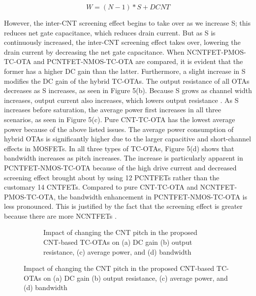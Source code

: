 \begin{equation}
  W = (N - 1)*S + DCNT
  \label{eq:10}
\end{equation}

However, the inter-CNT screening effect begins to take over as we increase S;
this reduces net gate capacitance, which reduces drain current. But as S is
continuously increased, the inter-CNT screening effect takes over, lowering the
drain current by decreasing the net gate capacitance. When NCNTFET-PMOS-TC-OTA
and PCNTFET-NMOS-TC-OTA are compared, it is evident that the former has a higher
DC gain than the latter. Furthermore, a slight increase in S modifies the DC
gain of the hybrid TC-OTAs. The output resistance of all OTAs decreases as S
increases, as seen in Figure 5(b). Because S grows as channel width increases,
output current also increases, which lowers output resistance
\cite{ref17,ref18,ref19}. As S increases before saturation, the average power
first increases in all three scenarios, as seen in Figure 5(c). Pure CNT-TC-OTA
has the lowest average power because of the above listed issues. The average
power consumption of hybrid OTAs is significantly higher due to the larger
capacitive and short-channel effects in MOSFETs. In all three types of TC-OTAs,
Figure 5(d) shows that bandwidth increases as pitch increases. The increase is
particularly apparent in PCNTFET-NMOS-TC-OTA because of the high drive current
and decreased screening effect brought about by using 12 PCNTFETs rather than
the customary 14 CNTFETs. Compared to pure CNT-TC-OTA and NCNTFET-PMOS-TC-OTA,
the bandwidth enhancement in PCNTFET-NMOS-TC-OTA is less pronounced. This is
justified by the fact that the screening effect is greater because there are
more NCNTFETs \cite{ref35,ref38}.

\begin{figure}[htbp]
  \centering
  \begin{subfigure}[b]{0.48\linewidth}
    \centering
  \end{subfigure}
  \hfill
  \begin{subfigure}[b]{0.48\linewidth}
    \centering
    \caption{Impact of changing the CNT pitch in the proposed CNT-based TC-OTAs on (a) DC gain (b) output resistance, (c) average power, and (d) bandwidth}

  \end{subfigure}
  \caption{Impact of changing the CNT pitch in the proposed CNT-based TC-OTAs on (a) DC gain (b) output resistance, (c) average power, and (d) bandwidth}

  \label{fig:group_wsr60}
\end{figure}

